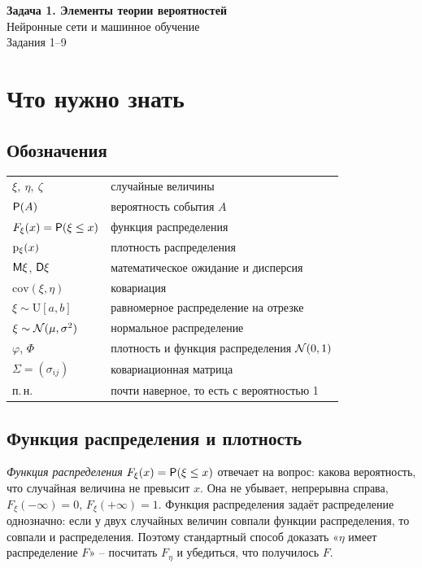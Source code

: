 \documentclass[12pt,a4paper]{article}
\begin{document}
\begin{center}
  {\large\bfseries Задача 1. Элементы теории вероятностей}\\[1mm]
  Нейронные сети и машинное обучение\\[1mm]
  Задания 1--9
\end{center}

\section{Что нужно знать}

\subsection{Обозначения}

\begin{center}
\begin{tabular}{ll}
\toprule
$\xi,\ \eta,\ \zeta$ & случайные величины \\
$\mathsf{P}(A)$ & вероятность события $A$ \\
$F_\xi(x) = \mathsf{P}(\xi \le x)$ & функция распределения \\
$\mathrm{p}_\xi(x)$ & плотность распределения \\
$\mathsf{M}\xi$, $\mathsf{D}\xi$ & математическое ожидание и дисперсия \\
$\mathrm{cov}(\xi,\eta)$ & ковариация \\
$\xi \sim \mathrm{U}[a,b]$ & равномерное распределение на отрезке \\
$\xi \sim \mathcal{N}(\mu,\sigma^2)$ & нормальное распределение \\
$\varphi$, $\Phi$ & плотность и функция распределения $\mathcal{N}(0,1)$ \\
$\Sigma = (\sigma_{ij})$ & ковариационная матрица \\
п.\,н. & почти наверное, то есть с вероятностью 1 \\
\bottomrule
\end{tabular}
\end{center}

\subsection{Функция распределения и плотность}

\emph{Функция распределения} $F_\xi(x) = \mathsf{P}(\xi \le x)$ отвечает на вопрос:
какова вероятность, что случайная величина не превысит $x$. Она не убывает,
непрерывна справа, $F_\xi(-\infty) = 0$, $F_\xi(+\infty) = 1$. Функция
распределения задаёт распределение однозначно: если у двух случайных величин
совпали функции распределения, то совпали и распределения. Поэтому стандартный
способ доказать «$\eta$ имеет распределение $F$» -- посчитать $F_\eta$ и
убедиться, что получилось $F$.
\end{document}
